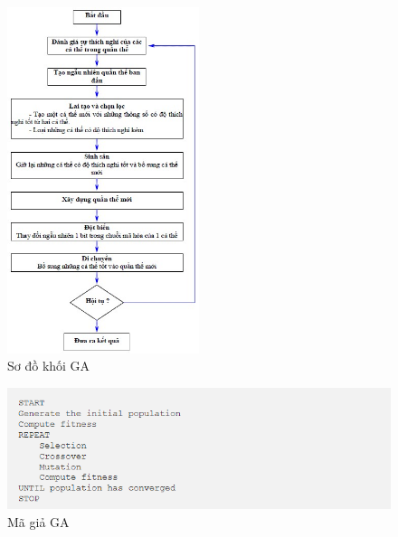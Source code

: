 \documentclass[14pt]{article}
\begin{document}
	\begin{figure}[htbp]
		\centering
		\includegraphics[width=0.5\textwidth]{./Image/So_Do_Khoi_GA.jpg}
		\caption{Sơ đồ khối GA}
		\label{fig:mylabel}
	\end{figure}
		
	\begin{figure}[htbp]
		\centering
		\includegraphics[width=\textwidth]{./Image/Mã giả GA.png}
		\caption{Mã giả GA}
		\label{fig:mylabel}
	\end{figure}
	\newpage
\end{document}
